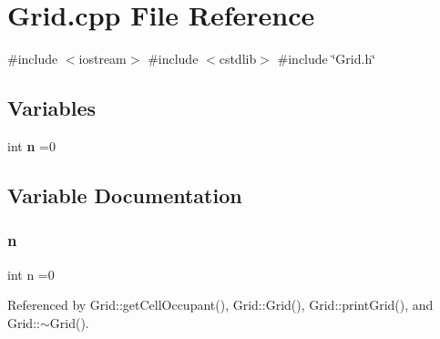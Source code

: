 \section{Grid.\+cpp File Reference}
\label{Grid_8cpp}
{\ttfamily \#include $<$iostream$>$}\newline
{\ttfamily \#include $<$cstdlib$>$}\newline
{\ttfamily \#include \char`\"{}Grid.\+h\char`\"{}}\newline
\subsection*{Variables}
\begin{DoxyCompactItemize}
\item 
int \textbf{ n} =0
\end{DoxyCompactItemize}


\subsection{Variable Documentation}
\mbox{\label{Grid_8cpp_a76f11d9a0a47b94f72c2d0e77fb32240}} 
\subsubsection{n}
{\footnotesize\ttfamily int n =0}



Referenced by Grid\+::get\+Cell\+Occupant(), Grid\+::\+Grid(), Grid\+::print\+Grid(), and Grid\+::$\sim$\+Grid().

